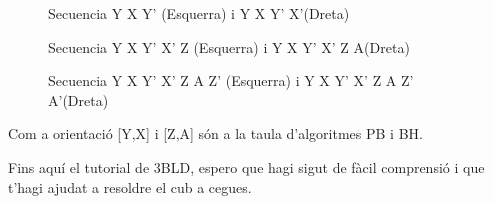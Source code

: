 \begin{figure}[h!]
    \centering
    \begin{subfigure}
        \centering\RubikCubeSolvedWY
    \end{subfigure}
    \begin{subfigure}
        \centering\RubikCubeSolvedWY
    \end{subfigure}
    \caption{Secuencia Y X Y' (Esquerra) i Y X Y' X'(Dreta)}
\end{figure}

\begin{figure}[h!]
    \centering
    \begin{subfigure}
        \centering\RubikCubeSolvedWY
    \end{subfigure}
    \begin{subfigure}
        \centering\RubikCubeSolvedWY
    \end{subfigure}
    \caption{Secuencia Y X Y' X' Z (Esquerra) i Y X Y' X' Z A(Dreta)}
\end{figure}

\begin{figure}[h!]
    \centering
    \begin{subfigure}
        \centering\RubikCubeSolvedWY
    \end{subfigure}
    \begin{subfigure}
        \centering\RubikCubeSolvedWY
    \end{subfigure}
    \caption{Secuencia Y X Y' X' Z A Z' (Esquerra) i Y X Y' X' Z A Z' A'(Dreta)}
\end{figure}

Com a orientació [Y,X] i [Z,A] són a la taula d'algoritmes PB i BH.

\vspace{5cm}
\newpage
\large{Fins aquí el tutorial de 3BLD, espero que hagi sigut de fàcil comprensió i que t'hagi ajudat a resoldre el cub a cegues.}